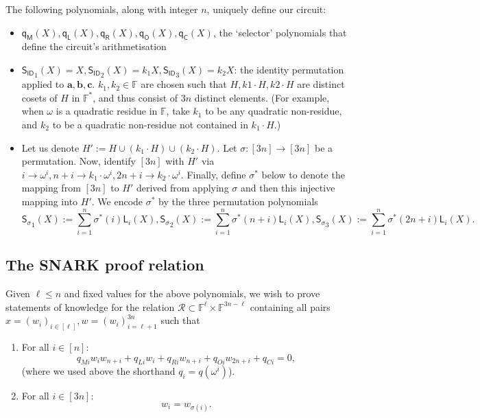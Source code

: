 \documentclass[11pt]{article} %
\newcommand{\F}{\ensuremath{\mathbb F}\xspace}
\newcommand{\defeq}{:=}
\newcommand{\sigpoly}{\ensuremath{\mathsf{S_{\sigma}}}\xspace}
\newcommand{\idpoly}{\ensuremath{\mathsf{S_{ID}}}\xspace}
\newcommand{\lvar}{\ensuremath{\mathbf{a}}\xspace}
\newcommand{\rvar}{\ensuremath{\mathbf{b}}\xspace}
\newcommand{\ovar}{\ensuremath{\mathbf{c}}\xspace}
\newcommand{\lagrangepoly}{\ensuremath{\mathsf{L}}\xspace}
\newcommand{\selmultpoly}{\ensuremath{\mathsf{q_M}}\xspace}
\newcommand{\selleftpoly}{\ensuremath{\mathsf{q_L}}\xspace}
\newcommand{\selrightpoly}{\ensuremath{\mathsf{q_R}}\xspace}
\newcommand{\seloutpoly}{\ensuremath{\mathsf{q_O}}\xspace}
\newcommand{\selconstpoly}{\ensuremath{\mathsf{q_C}}\xspace}
\newcommand{\R}{\mathcal{R}}
\newcommand{\Rsnark}{\R}
\begin{document}
The following polynomials, along with integer $n$, uniquely define our circuit:

\begin{itemize}
	\item $\selmultpoly(X), \selleftpoly(X), \selrightpoly(X), \seloutpoly(X), \selconstpoly(X)$, the `selector' polynomials that define the circuit's arithmetisation
	\item $\idpoly_1(X) = X, \idpoly_2(X) = k_1X, \idpoly_3(X) = k_2X$: the identity permutation applied to $\lvar, \rvar, \ovar$. $k_1, k_2\in \F$ are chosen such that $H,k1\cdot H,k2\cdot H$ are distinct cosets of $H$ in $\F^*$, and thus consist of $3n$ distinct elements. (For example, when $\omega$ is a quadratic residue in $\F$, take $k_1$ to be any quadratic non-residue, and $k_2$ to be a  quadratic non-residue not contained in $k_1\cdot H$.)
	\item Let us denote $H'\defeq H\cup (k_1\cdot H)\cup (k_2\cdot H)$. Let $\sigma:[3n]\to[3n]$ be a permutation. Now, identify $[3n]$ with $H'$ via $i \to \omega^i,n+i \to k_1\cdot \omega^i,2n+i \to k_2\cdot \omega^i$.  Finally, define  $\sigma^{*}$ below to denote the mapping from $[3n]$ to $H'$ derived from applying $\sigma$ and then this injective mapping into $H'$.
We encode $\sigma^*$  by the three permutation polynomials	
	\[\sigpoly_1(X) \defeq \sum_{i=1}^n \sigma^*(i) \lagrangepoly_i(X), \sigpoly_2(X) \defeq \sum_{i=1}^n \sigma^*(n + i) \lagrangepoly_i(X), \sigpoly_3(X) \defeq \sum_{i=1}^n \sigma^*(2n + i) \lagrangepoly_i(X).\]
\end{itemize}

% 
% 
\subsection{The SNARK proof relation}
Given $\ell\leq n$ and fixed values for the above polynomials, we wish to prove statements of knowledge for the relation $\Rsnark\subset \F^{\ell}\times \F^{3n-\ell}$ containing all pairs
$x=(w_i)_{i \in [\ell]}, w=(w_i)_{i=\ell+1}^{3n}$
such that
\begin{enumerate}
\item For all  $i \in [n]$:  \[q_{Mi} w_i w_{n+i} + q_{Li}w_i  + q_{Ri}w_{n+i} + q_{Oi}w_{2n+i}  + q_{Ci} = 0,\]
(where we used above the shorthand $q_i=q(\omega^i)$).
\item  For all $i \in [3n]$: \[w_i = w_{\sigma(i)}.\]
 
\end{enumerate}
\end{document}
